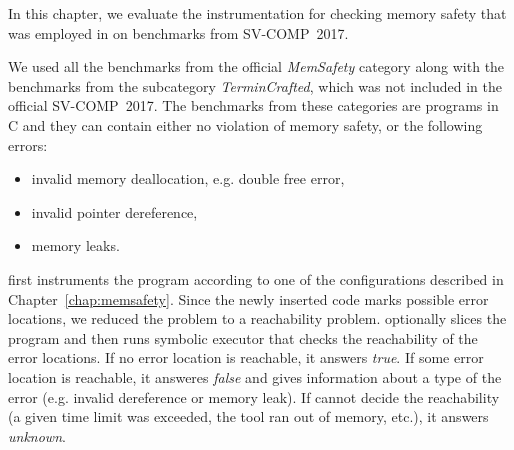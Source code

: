 In this chapter, we evaluate the instrumentation for checking memory safety
that was employed in \symbiotic on benchmarks from SV-COMP~2017.

We used all the benchmarks from the official \emph{MemSafety} category along
with the benchmarks from the subcategory \emph{TerminCrafted}, which was not
included in the official SV-COMP~2017. The benchmarks from these categories are
programs in C and they can contain either no violation of memory safety, or the
following errors:
\begin{itemize}
  \item invalid memory deallocation, e.g. double free error,
  \item invalid pointer dereference,
  \item memory leaks.
\end{itemize}

\symbiotic first instruments the program according to one of the configurations
described in Chapter~\ref{chap:memsafety}. Since the newly inserted code marks
possible error locations, we reduced the problem to a reachability problem.
\symbiotic optionally slices the program and then runs symbolic executor \klee
that checks the reachability of the error locations. If no error location is
reachable, it answers \emph{true}. If some error location is reachable, it
answeres \emph{false} and gives information about a type of the error (e.g.
invalid dereference or memory leak). If \symbiotic cannot decide the
reachability (a given time limit was exceeded, the tool ran out of memory,
etc.), it answers \emph{unknown}.
